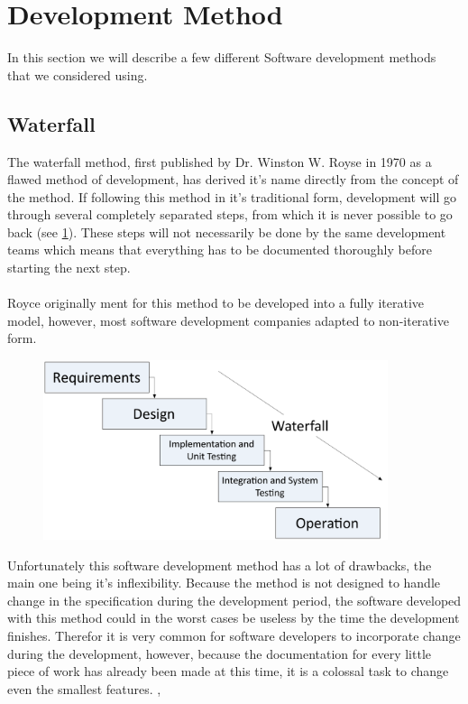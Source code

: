 \section{Development Method}
\label{sec:DevelopmentMethods}
In this section we will describe a few different Software development methods that we considered using.

\subsection{Waterfall}
The waterfall method, first published by Dr. Winston W. Royse in 1970 as a flawed method of development, has derived it's name directly from the concept of the method. If following this method in it's traditional form, development will go through several completely separated steps, from which it is never possible to go back (see \ref{fig:WaterfallPic}). These steps will not necessarily be done by the same development teams which means that everything has to be documented thoroughly before starting the next step.\\
 \\
Royce originally ment for this method to be developed into a fully iterative model, however, most software development companies adapted to non-iterative form.
\cite{waterfallroyce}

\begin{figure}[H]
	\centering
		\includegraphics[width=0.90\textwidth]{input/implementation/development/waterfall.pdf}
	\label{fig:WaterfallPic}
\end{figure}

Unfortunately this software development method has a lot of drawbacks, the main one being it's inflexibility. Because the method is not designed to handle change in the specification during the development period, the software developed with this method could in the worst cases be useless by the time the development finishes. Therefor it is very common for software developers to incorporate change during the development, however, because the documentation for every little piece of work has already been made at this time, it is a colossal task to change even the smallest features. 
\cite{waterfall}, \cite{waterfall3}
